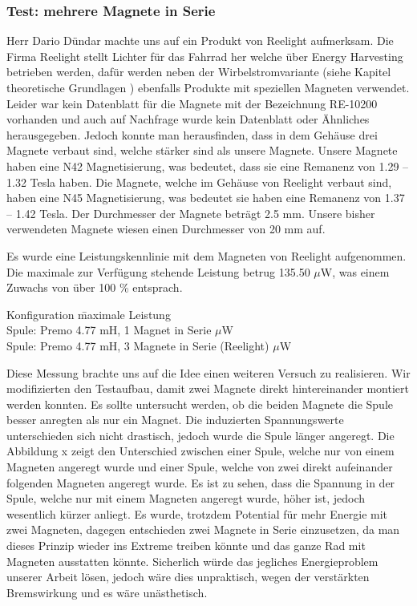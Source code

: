 \subsubsection{Test: mehrere Magnete in Serie}

Herr Dario Dündar machte uns auf ein Produkt von Reelight aufmerksam. Die Firma Reelight stellt Lichter für das Fahrrad her welche über Energy Harvesting betrieben werden, dafür werden neben der Wirbelstromvariante (siehe Kapitel theoretische Grundlagen ) ebenfalls Produkte mit speziellen Magneten verwendet. Leider war kein Datenblatt für die Magnete mit der Bezeichnung RE-10200 vorhanden und auch auf Nachfrage wurde kein Datenblatt oder Ähnliches herausgegeben. Jedoch konnte man herausfinden, dass in dem Gehäuse drei Magnete verbaut sind, welche stärker sind als unsere Magnete. Unsere Magnete haben eine N42 Magnetisierung, was bedeutet, dass sie eine Remanenz von 1.29 – 1.32 Tesla haben. Die Magnete, welche im Gehäuse von Reelight verbaut sind, haben eine N45 Magnetisierung, was bedeutet sie haben eine Remanenz von 1.37 – 1.42 Tesla. Der Durchmesser der Magnete beträgt 2.5 mm. Unsere bisher verwendeten Magnete wiesen einen Durchmesser von 20 mm auf. 

Es wurde eine Leistungskennlinie mit dem Magneten von Reelight aufgenommen. Die maximale zur Verfügung stehende Leistung betrug 135.50 $\mu$W, was einem Zuwachs von über 100 \% entsprach.

\begin{tabbing}
    Konfiguration\hphantom{4.77 mH, 3 Magnete in Serie (Reelight)}   \quad\= maximale Leistung    \\[0.8ex]
    Spule: Premo 4.77 mH, 1 Magnet in Serie         $\mu$W\\
	Spule: Premo 4.77 mH, 3 Magnete in Serie (Reelight)         $\mu$W
\end{tabbing}

Diese Messung brachte uns auf die Idee einen weiteren Versuch zu realisieren. Wir modifizierten den Testaufbau, damit zwei Magnete direkt hintereinander montiert werden konnten. Es sollte untersucht werden, ob die beiden Magnete die Spule besser anregten als nur ein Magnet. Die induzierten Spannungswerte unterschieden sich nicht drastisch, jedoch wurde die Spule länger angeregt. Die Abbildung x zeigt den Unterschied zwischen einer Spule, welche nur von einem Magneten angeregt wurde und einer Spule, welche von zwei direkt aufeinander folgenden Magneten angeregt wurde. Es ist zu sehen, dass die Spannung in der Spule, welche nur mit einem Magneten angeregt wurde, höher ist, jedoch wesentlich kürzer anliegt. Es wurde, trotzdem Potential für mehr Energie mit zwei Magneten, dagegen entschieden zwei Magnete in Serie einzusetzen, da man dieses Prinzip wieder ins Extreme treiben könnte und das ganze Rad mit Magneten ausstatten könnte. Sicherlich würde das jegliches Energieproblem unserer Arbeit lösen, jedoch wäre dies unpraktisch, wegen der verstärkten Bremswirkung und es wäre unästhetisch.


